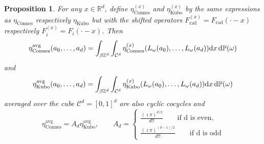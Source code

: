 \documentclass[12pt]{amsart}
\newtheorem{proposition}[theorem]{Proposition}
\newcommand{\RM}{{\mathbb R}}
\newcommand{\ZM}{{\mathbb Z}}
\newcommand{\PM}{{\mathbb P}}
\newcommand{\Cc}{{\mathcal C}}
\newcommand{\difd}{\textup{d}}
\begin{document}
\begin{proposition}
For any $x\in \RM^d$, define $\eta^{(x)}_{\mathrm{Connes}}$ and $\eta_{\mathrm{Kubo}}^{(x)}$ by the same expressions as $\eta_{\mathrm{Connes}}$ respectively $\eta_{\mathrm{Kubo}}$ but with the shifted operators $F_{\mathrm{rad}}^{(x)}=F_{\mathrm{rad}}(\cdot-x)$ respectively $F_{i}^{(x)}=F_{i}(\cdot-x)$. 
Then 
$$\eta^{\mathrm{avg}}_{\mathrm{Connes}}(a_0,\dots,a_d) = \int_{\beta\ZM^d} \int_{\Cc^d} \eta^{(x)}_{\mathrm{Connes}}(L_\omega(a_0),\dots,L_{\omega}(a_d))\difd{x}\,\difd{\PM}(\omega)$$
and
$$\eta^{\mathrm{avg}}_{\mathrm{Kubo}}(a_0,\dots,a_d) = \int_{\beta\ZM^d} \int_{\Cc^d} \eta^{(x)}_{\mathrm{Kubo}}(L_\omega(a_0),\dots,L_{\omega}(a_d))\difd{x}\,\difd{\PM}(\omega)$$
averaged over the cube $\Cc^d=[0,1]^d$ are also cyclic cocycles and
\begin{equation}
\label{eq:norm_consts2}
\eta^{\mathrm{avg}}_{\mathrm{Connes}} = A_d \eta^{\mathrm{avg}}_{\mathrm{Kubo}}, \qquad A_d=\begin{cases}
    \frac{(\imath \pi)^{d/2}}{d!!} \qquad \text{if d is even}, \\
    \frac{ (\imath \pi)^{(d-1)/2}}{d!!} \qquad \text{if d is odd}
    \end{cases}
\end{equation}
\end{proposition}
\end{document}
